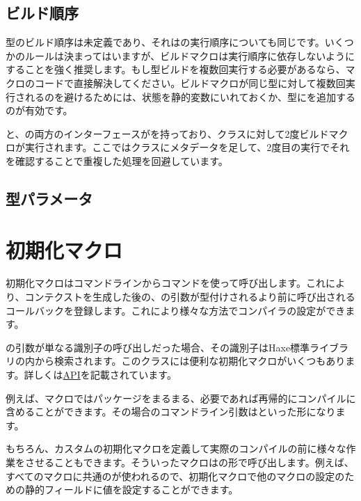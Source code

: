 
\subsection{ビルド順序}
\label{macro-limitations-build-order}

型のビルド順序は未定義であり、それはの実行順序についても同じです。いくつかのルールは決まってはいますが、ビルドマクロは実行順序に依存しないようにすることを強く推奨します。もし型ビルドを複数回実行する必要があるなら、マクロのコードで直接解決してください。ビルドマクロが同じ型に対して複数回実行されるのを避けるためには、状態を静的変数にいれておくか、型にを追加するのが有効です。


と、の両方のインターフェースがを持っており、クラスに対して2度ビルドマクロが実行されます。ここではクラスにメタデータを足して、2度目の実行でそれを確認することで重複した処理を回避しています。


\subsection{型パラメータ}
\label{macro-limitations-type-parameters}


\section{初期化マクロ}
\label{macro-initialization}

初期化マクロはコマンドラインからコマンドを使って呼び出します。これにより、コンテクストを生成した後の、の引数が型付けされるより前に呼び出されるコールバックを登録します。これにより様々な方法でコンパイラの設定ができます。

の引数が単なる識別子の呼び出しだった場合、その識別子はHaxe標準ライブラリの内から検索されます。このクラスには便利な初期化マクロがいくつもあります。詳しくは\href{http://api.haxe.org//haxe/macro/Compiler.html}{API}を記載されています。

例えば、マクロではパッケージをまるまる、必要であれば再帰的にコンパイルに含めることができます。その場合のコマンドライン引数はといった形になります。

もちろん、カスタムの初期化マクロを定義して実際のコンパイルの前に様々な作業をさせることもできます。そういったマクロはの形で呼び出します。例えば、すべてのマクロに共通のが使われるので、初期化マクロで他のマクロの設定のための静的フィールドに値を設定することができます。